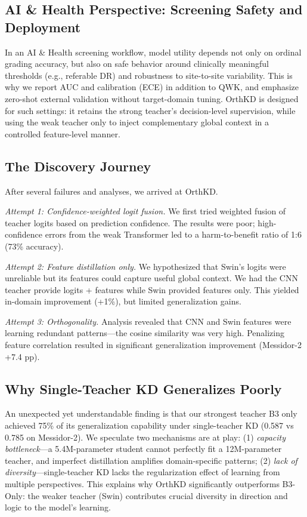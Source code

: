 \documentclass{article}
\begin{document}
\subsection{AI \& Health Perspective: Screening Safety and Deployment}
In an AI \& Health screening workflow, model utility depends not only on ordinal grading accuracy, but also on safe behavior around clinically meaningful thresholds (e.g., referable DR) and robustness to site-to-site variability. This is why we report AUC and calibration (ECE) in addition to QWK, and emphasize zero-shot external validation without target-domain tuning. OrthKD is designed for such settings: it retains the strong teacher's decision-level supervision, while using the weak teacher only to inject complementary global context in a controlled feature-level manner.

\subsection{The Discovery Journey}
After several failures and analyses, we arrived at OrthKD.

\textit{Attempt 1: Confidence-weighted logit fusion.} We first tried weighted fusion of teacher logits based on prediction confidence. The results were poor; high-confidence errors from the weak Transformer led to a harm-to-benefit ratio of 1:6 (73\% accuracy).

\textit{Attempt 2: Feature distillation only.} We hypothesized that Swin's logits were unreliable but its features could capture useful global context. We had the CNN teacher provide logits + features while Swin provided features only. This yielded in-domain improvement (+1\%), but limited generalization gains.

\textit{Attempt 3: Orthogonality.} Analysis revealed that CNN and Swin features were learning redundant patterns---the cosine similarity was very high. Penalizing feature correlation resulted in significant generalization improvement (Messidor-2 +7.4 pp).

\subsection{Why Single-Teacher KD Generalizes Poorly}
An unexpected yet understandable finding is that our strongest teacher B3 only achieved 75\% of its generalization capability under single-teacher KD (0.587 vs 0.785 on Messidor-2). We speculate two mechanisms are at play: (1) \textit{capacity bottleneck}---a 5.4M-parameter student cannot perfectly fit a 12M-parameter teacher, and imperfect distillation amplifies domain-specific patterns; (2) \textit{lack of diversity}---single-teacher KD lacks the regularization effect of learning from multiple perspectives. This explains why OrthKD significantly outperforms B3-Only: the weaker teacher (Swin) contributes crucial diversity in direction and logic to the model's learning.
\end{document}
